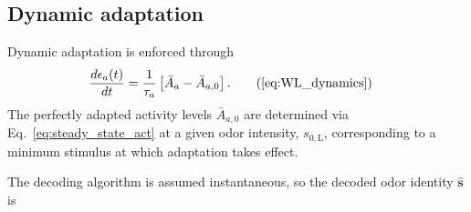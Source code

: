 \subsection{Dynamic adaptation}

Dynamic adaptation is enforced through
\begin{align}
	\frac{d\epsilon_a(t)}{dt} &= \frac{1}{\tau_a}\left[\bar{A}_a - \bar {A}_{a,0}\right].
	\tag{\ref{eq:WL_dynamics}}
\end{align}
The perfectly adapted activity levels $\bar {A}_{a,0}$ are determined via Eq.~\ref{eq:steady_state_act} at a given odor intensity, $s_{0, \text{L}}$, corresponding to a minimum stimulus at which adaptation takes effect. 


The decoding algorithm is assumed instantaneous, so the decoded odor identity $\mathbf {\hat s}$ is 
